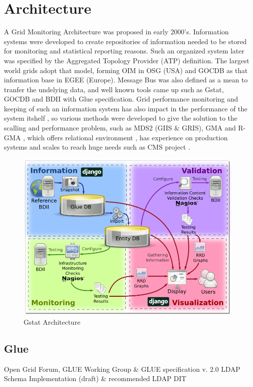 \section{Architecture}
A Grid Monitoring Architecture \cite{tierney2002grid} was proposed in early
2000's. Information systems were developed to create repositories of information
needed to be stored for monitoring and statistical reporting reasons. Such an
organized system later was specified by the Aggregated Topology Provider (ATP)
definition. The largest world grids adopt that model, forming OIM in OSG (USA)
and GOCDB as that information base in EGEE (Europe). Message Bus was also
defined as a mean to tranfer the undelying data, and well known tools came up
such as Gstat, GOCDB and BDII with Glue specification. Grid performance
monitoring and keeping of such an information system has also impact in the
performance of the system itshelf \cite{zhang2003performance}, so various
methods were developed to give the solution to the scalling and performance
problem, such as MDS2 (GIIS \& GRIS), GMA and R-GMA
\cite{wilson2004information}, which offers relational environment
\cite{fisher2001relational}, has experience on production systems 
\cite{byrom-production} and scales to reach huge needs such as CMS project
\cite{Bonacorsi2004,Byrom}.


\begin{figure}[htb]
\centering
\includegraphics[width=150mm]{images/gstat-architecture.jpg}
\caption{Gstat Architecture}
\label{figure:gstat-arch}
\end{figure}

\subsection{Glue}
Open Grid Forum, GLUE Working Group \& GLUE specification v. 2.0
LDAP Schema Implementation (draft) \& recommended LDAP DIT


